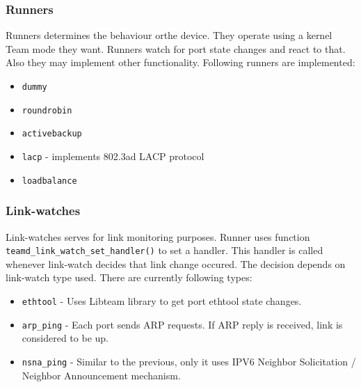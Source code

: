 \documentclass[11pt,a4paper]{article}
\begin{document}
\subsubsection{Runners}

Runners determines the behaviour orthe device. They operate using a kernel Team mode they want. Runners watch for port state changes and react to that. Also they may implement other functionality. Following runners are implemented:

\begin{itemize}
\item \verb+dummy+ 
\item \verb+roundrobin+ 
\item \verb+activebackup+
\item \verb+lacp+ - implements 802.3ad LACP protocol
\item \verb+loadbalance+
\end{itemize}

\subsubsection{Link-watches}

Link-watches serves for link monitoring purposes. Runner uses function \verb+teamd_link_watch_set_handler()+ to set a handler. This handler is called whenever link-watch decides that link change occured. The decision depends on link-watch type used. There are currently following types:

\begin{itemize}
\item \verb+ethtool+ - Uses Libteam library to get port ethtool state changes. 
\item \verb+arp_ping+ - Each port sends ARP requests. If ARP reply is received, link is considered to be up.
\item \verb+nsna_ping+ - Similar to the previous, only it uses IPV6 Neighbor Solicitation / Neighbor Announcement mechanism.
\end{itemize}
\end{document}
